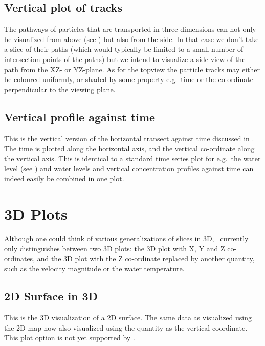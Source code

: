 \subsection{Vertical plot of tracks} \label{Subsec:VerticalTracks}
The pathways of particles that are transported in three dimensions can not only be visualized from above (see ) but also from the side.
In that case we don't take a slice of their paths (which would typically be limited to a small number of intersection points of the paths) but we intend to visualize a side view of the path from the XZ- or YZ-plane.
As for the topview the particle tracks may either be coloured uniformly, or shaded by some property e.g.~time or the co-ordinate perpendicular to the viewing plane.

\subsection{Vertical profile against time} \label{Subsec:ProfileTime}
This is the vertical version of the horizontal transect against time discussed in .
The time is plotted along the horizontal axis, and the vertical co-ordinate along the vertical axis.
This is identical to a standard time series plot for e.g.~the water level (see ) and water levels and vertical concentration profiles against time can indeed easily be combined in one plot.

\section{3D Plots} \label{Sec:PlotStyle3D}
Although one could think of various generalizations of slices in 3D, \QUICKPLOT\ currently only distinguishes between two 3D plots: the 3D plot with X, Y and Z co-ordinates, and the 3D plot with the Z co-ordinate replaced by another quantity, such as the velocity magnitude or the water temperature.

\subsection{2D Surface in 3D} \label{Subsec:2DSurfaceIn3D}
This is the 3D visualization of a 2D surface.
The same data as visualized using the 2D map  now also visualized using the quantity as the vertical coordinate.
This plot option is not yet supported by \QUICKPLOT.
